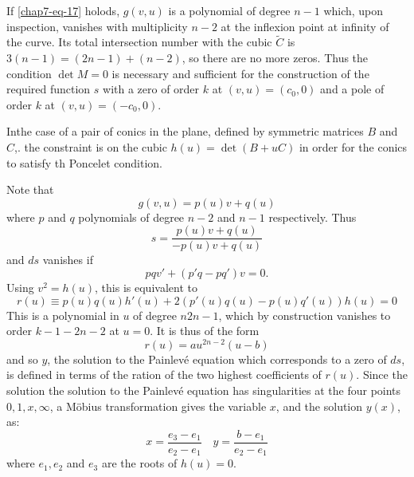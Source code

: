 If \eqref{chap7-eq-17} holods, $g(v,u)$ is a polynomial of degree $n-1$ which, upon inspection, vanishes with multiplicity $n-2$ at the inflexion point at infinity of the curve. Its total intersection number with the cubic $\tilde{C}$ is $3(n-1) = (2n-1)+(n-2)$, so there are no more zeros. Thus the condition $\det M =0 $ is necessary and sufficient for the construction of the required function $s$ with a zero of order $k$ at $(v, u)=(c_{0},0)$ and a pole of order $k$ at $(v,u)= (-c_{0},0)$.

In\pageoriginale the case of a pair of conics in the plane, defined by symmetric matrices $B$ and $C$,. the constraint is on the cubic $h(u)=\det(B+uC)$ in order for the conics to satisfy th Poncelet condition.

Note that
$$
g(v,u) = p(u)v +q(u)
$$
where $p$ and $q$ polynomials of degree $n-2$ and $n-1$ respectively. Thus
$$
s = \dfrac{p(u)v + q(u)}{-p(u)v + q(u)}
$$
and $ds$ vanishes if
$$
pqv' + (p'q-pq')v=0.
$$
Using $v^{2}=h(u)$, this is equivalent to
$$
r(u)\equiv p(u)q(u)h'(u) + 2(p'(u)q(u)-p(u)q'(u))h(u)=0
$$
This is a polynomial in $u$ of degree $n2n-1$, which by construction vanishes to order $k-1-2n-2$ at $u =0$. It is thus of the form
$$
r(u)=au^{2n-2}(u-b)
$$
and so $y$, the solution to the Painlev\'e equation which corresponds to a zero
 of $ds$, is defined in terms of the ration of the two highest coefficients of $r(u)$. Since the solution the solution to the Painlev\'e equation has singularities at the four points $0,1,x, \infty$, a M\"obius transformation gives the variable $x$, and the solution $y(x)$, as:
 \begin{equation*}\label{chap7-eq-18}
x= \dfrac{e_{3}-e_{1}}{e_{2}-e_{1}} \quad y=\dfrac{b-e_{1}}{e_{2}-e_{1}}\tag{18}
 \end{equation*}   
where $e_{1}, e_{2}$ and $e_{3}$ are the roots of $h(u)=0$.

